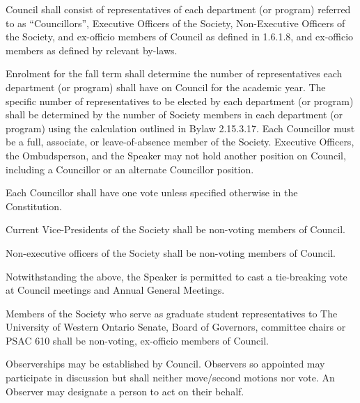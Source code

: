 \begin{longenum}[label*=\thesubsection.\arabic*., align=left]
    \item Council shall consist of representatives of each department (or program) referred to as ``Councillors'', Executive Officers of the
Society, Non-Executive Officers of the Society, and ex-officio members of Council as defined in 1.6.1.8, and ex-officio members as
defined by relevant by-laws.   
\item Enrolment for the fall term shall determine the number of representatives each department (or program) shall have on Council for the academic year. The specific number of representatives to be elected by each department (or program) shall be determined by the number of Society members in each department (or program) using the calculation outlined in Bylaw 2.15.3.17. Each Councillor must be a full, associate, or leave-of-absence member of the Society. Executive Officers, the Ombudsperson, and the Speaker may not hold another position on Council, including a Councillor or an alternate Councillor position. 
    \item Each Councillor shall have one vote unless specified otherwise in the Constitution. 
    \item Current Vice-Presidents of the Society shall be non-voting members of Council.
    \item Non-executive officers of the Society shall be non-voting members of Council.
    	\begin{longenum}[label*=\arabic*., align=left]
    \item Notwithstanding the above, the Speaker is permitted to cast a tie-breaking vote at Council meetings and Annual General Meetings.
  	\end{longenum}
    \item Members of the Society who serve as graduate student representatives to The University of Western Ontario Senate, Board of Governors, committee chairs or PSAC 610 shall be non-voting, ex-officio members of Council.
    \item Observerships may be established by Council. Observers so appointed may participate in discussion but shall neither move/second motions nor vote. An Observer may designate a person to act on their behalf. 
\end{longenum}


